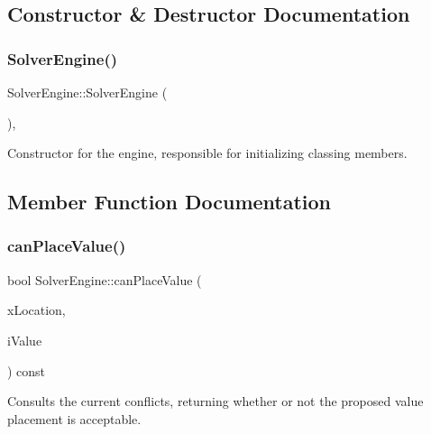 \subsection{Constructor \& Destructor Documentation}
\mbox{\label{class_solver_engine_a677b5fe26a9eea0dea994cc3f9027211}} 
\subsubsection{\texorpdfstring{Solver\+Engine()}{SolverEngine()}}
{\footnotesize\ttfamily Solver\+Engine\+::\+Solver\+Engine (\begin{DoxyParamCaption}{ }\end{DoxyParamCaption})\hspace{0.3cm}{\ttfamily [inline]}, {\ttfamily [private]}}



Constructor for the engine, responsible for initializing classing members. 



\subsection{Member Function Documentation}
\mbox{\label{class_solver_engine_a7e9939f155549012b8be1bb854eba5c3}} 
\subsubsection{\texorpdfstring{can\+Place\+Value()}{canPlaceValue()}}
{\footnotesize\ttfamily bool Solver\+Engine\+::can\+Place\+Value (\begin{DoxyParamCaption}\item[{const \mbox{\hyperlink{struct_solver_engine_1_1x_location__t}{x\+Location\+\_\+t}} \&}]{x\+Location,  }\item[{int}]{i\+Value }\end{DoxyParamCaption}) const\hspace{0.3cm}{\ttfamily [private]}}



Consults the current conflicts, returning whether or not the proposed value placement is acceptable. 

